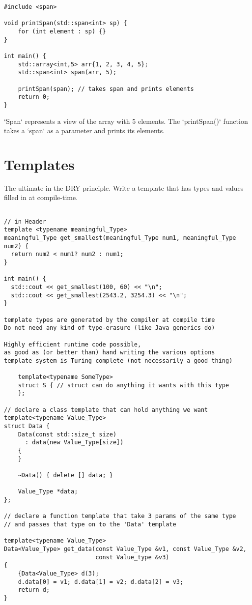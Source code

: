 \documentclass[openany]{report}
\begin{document}
\begin{verbatim}
#include <span>

void printSpan(std::span<int> sp) {
    for (int element : sp) {}
}

int main() {
    std::array<int,5> arr{1, 2, 3, 4, 5};
    std::span<int> span(arr, 5);

    printSpan(span); // takes span and prints elements
    return 0;
}
\end{verbatim}

`Span` represents a view of the array with 5 elements. 
The `printSpan()` function takes a `span` as a parameter and prints its elements.

\section{Templates}

The ultimate in the DRY principle. Write a template that has types and values filled in at compile-time.

\begin{verbatim}

// in Header
template <typename meaningful_Type>
meaningful_Type get_smallest(meaningful_Type num1, meaningful_Type num2) {
  return num2 < num1? num2 : num1;
}

int main() {
  std::cout << get_smallest(100, 60) << "\n";
  std::cout << get_smallest(2543.2, 3254.3) << "\n";
}

template types are generated by the compiler at compile time
Do not need any kind of type-erasure (like Java generics do)

Highly efficient runtime code possible, 
as good as (or better than) hand writing the various options
template system is Turing complete (not necessarily a good thing)

    template<typename SomeType>
    struct S { // struct can do anything it wants with this type
    };

// declare a class template that can hold anything we want
template<typename Value_Type>
struct Data {
    Data(const std::size_t size)
      : data(new Value_Type[size])
    {
    }

    ~Data() { delete [] data; }

    Value_Type *data;
};

// declare a function template that take 3 params of the same type
// and passes that type on to the 'Data' template

template<typename Value_Type>
Data<Value_Type> get_data(const Value_Type &v1, const Value_Type &v2,
                          const Value_type &v3)
{
    {Data<Value_Type> d(3);
    d.data[0] = v1; d.data[1] = v2; d.data[2] = v3;
    return d;
}
\end{verbatim}
\end{document}
